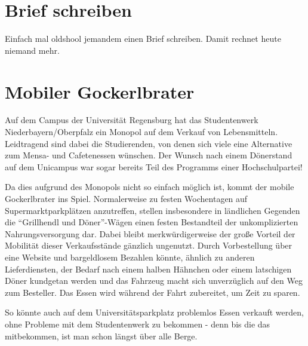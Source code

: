 \documentclass[a5paper,pagesize,10pt,bibtotoc,pointlessnumbers,normalheadings,DIV=9,twoside=false]{scrbook}
\begin{document}



\chapter{Brief schreiben}

Einfach mal oldshool jemandem einen Brief schreiben.
Damit rechnet heute niemand mehr.

\chapter{Mobiler Gockerlbrater}

Auf dem Campus der Universität Regensburg hat das Studentenwerk Niederbayern/Oberpfalz ein Monopol auf dem Verkauf von Lebensmitteln.
Leidtragend sind dabei die Studierenden, von denen sich viele eine Alternative zum Mensa- und Cafetenessen wünschen.
Der Wunsch nach einem Dönerstand auf dem Unicampus war sogar bereits Teil des Programms einer Hochschulpartei!

Da dies aufgrund des Monopols nicht so einfach möglich ist, kommt der mobile Gockerlbrater ins Spiel.
Normalerweise zu festen Wochentagen auf Supermarktparkplätzen anzutreffen, stellen insbesondere in ländlichen Gegenden die ``Grillhendl und Döner''-Wägen einen festen Bestandteil der unkomplizierten Nahrungsversorgung dar.
Dabei bleibt merkwürdigerweise der große Vorteil der Mobilität dieser Verkaufsstände gänzlich ungenutzt.
Durch Vorbestellung über eine Website und bargeldlosem Bezahlen könnte, ähnlich zu anderen Lieferdiensten, der Bedarf nach einem halben Hähnchen oder einem latschigen Döner kundgetan werden und das Fahrzeug macht sich unverzüglich auf den Weg zum Besteller.
Das Essen wird während der Fahrt zubereitet, um Zeit zu sparen.

So könnte auch auf dem Universitätsparkplatz problemlos Essen verkauft werden, ohne Probleme mit dem Studentenwerk zu bekommen - denn bis die das mitbekommen, ist man schon längst über alle Berge.
\end{document}
